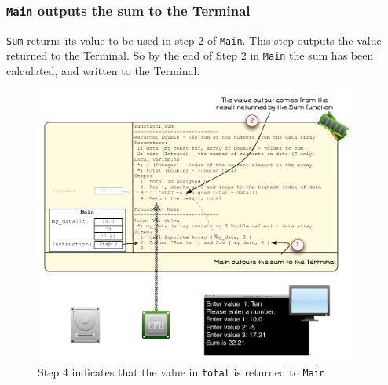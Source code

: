 
\clearpage
\subsubsection{\texttt{Main} outputs the sum to the Terminal} %
\label{ssub:main_outputs_the_sum_to_the_terminal}

\texttt{Sum} returns its value to be used in step 2 of \texttt{Main}. This step outputs the value returned to the Terminal. So by the end of Step 2 in \texttt{Main} the sum has been calculated, and written to the Terminal.

\begin{figure}[htbp]
   \centering
   \includegraphics[width=0.95\textwidth]{./topics/arrays/images/Sum11} 
   \caption{Step 4 indicates that the value in \texttt{total} is returned to \texttt{Main}}
   \label{fig:sum-array-vis-11}
\end{figure}



